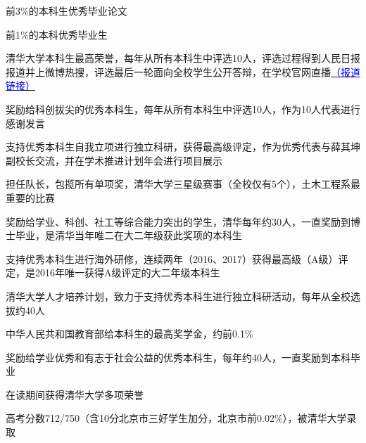 前3\%的本科生优秀毕业论文
\vspace{5pt}

前1\%的本科优秀毕业生
\vspace{5pt}

\nopagebreak
清华大学本科生最高荣誉，每年从所有本科生中评选10人，评选过程得到人民日报报道并上微博热搜，评选最后一轮面向全校学生公开答辩，在学校官网直播{\href{http://www.tuef.tsinghua.edu.cn/info/qhyx/3216}{\textcolor{blue}{{（报道链接）}}}}
\vspace{5pt}

奖励给科创拔尖的优秀本科生，每年从所有本科生中评选10人，作为10人代表进行感谢发言
\vspace{5pt}

支持优秀本科生自我立项进行独立科研，获得最高级评定，作为优秀代表与薛其坤副校长交流，并在学术推进计划年会进行项目展示
\vspace{5pt}

担任队长，包揽所有单项奖，清华大学三星级赛事（全校仅有5个），土木工程系最重要的比赛
\vspace{5pt}

奖励给学业、科创、社工等综合能力突出的学生，清华每年约30人，一直奖励到博士毕业，是清华当年唯二在大二年级获此奖项的本科生
\vspace{5pt}

支持优秀本科生进行海外研修，连续两年（2016、2017）获得最高级（A级）评定，是2016年唯一获得A级评定的大二年级本科生
\vspace{5pt}

清华大学人才培养计划，致力于支持优秀本科生进行独立科研活动，每年从全校选拔约40人
\vspace{5pt}

中华人民共和国教育部给本科生的最高奖学金，约前0.1\%
\vspace{5pt}


奖励给学业优秀和有志于社会公益的优秀本科生，每年约40人，一直奖励到本科毕业
\vspace{5pt}

在读期间获得清华大学多项荣誉
\vspace{5pt}

高考分数712/750（含10分北京市三好学生加分，北京市前0.02\%），被清华大学录取

